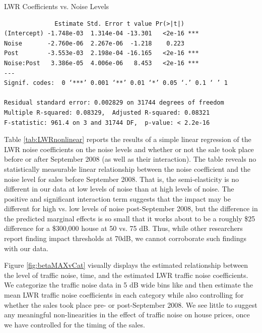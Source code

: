 \documentclass{article}\usepackage{graphicx, color}
\begin{document}
\begin{table}
\caption{LWR Coefficients vs. Noise Levels}\label{tab:LWRnonlinear}
\begin{verbatim}
              Estimate Std. Error t value Pr(>|t|)    
(Intercept) -1.748e-03  1.314e-04 -13.301   <2e-16 ***
Noise       -2.760e-06  2.267e-06  -1.218    0.223    
Post        -3.553e-03  2.198e-04 -16.165   <2e-16 ***
Noise:Post   3.386e-05  4.006e-06   8.453   <2e-16 ***
---
Signif. codes:  0 ‘***’ 0.001 ‘**’ 0.01 ‘*’ 0.05 ‘.’ 0.1 ‘ ’ 1 

Residual standard error: 0.002829 on 31744 degrees of freedom
Multiple R-squared: 0.08329,  Adjusted R-squared: 0.08321 
F-statistic: 961.4 on 3 and 31744 DF,  p-value: < 2.2e-16 
\end{verbatim}
\end{table}

Table \ref{tab:LWRnonlinear} reports the results of a simple linear regression of the LWR noise coefficients on the noise levels and whether or not the sale took place before or after September 2008 (as well as their interaction). The table reveals no statistically measurable linear relationship between the noise coefficient and the noise level for sales before September 2008. That is, the semi-elasticity is no different in our data at low levels of noise than at high levels of noise. The positive and significant interaction term suggests that the impact may be different for high vs. low levels of noise post-September 2008, but the difference in the predicted marginal effects is so small that it works about to be a roughly \$25 difference for a \$300,000 house at 50 vs. 75 dB. Thus, while other researchers report finding impact thresholds at 70dB, we cannot corroborate such findings with our data.

Figure \ref{fig:betaMAXvCat} visually displays the estimated relationship between the level of traffic noise, time, and the estimated LWR traffic noise coefficients. We categorize the traffic noise data in 5 dB wide bins like \citet{Theebe2004a} and then estimate the mean LWR traffic noise coefficients in each category while also controlling for whether the sales took place pre- or post-September 2008. We see little to suggest any meaningful non-linearities in the effect of traffic noise on house prices, once we have controlled for the timing of the sales.
\end{document}
